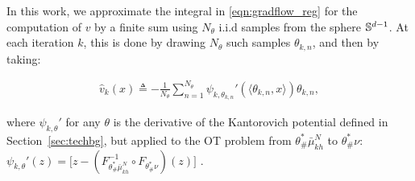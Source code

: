 In this work, we approximate the integral in \eqref{eqn:gradflow_reg} for the computation of $v$ by a finite sum using $N_\theta$ i.i.d samples from the sphere $\mathbb{S}^{d-1}$. At each iteration $k$, this is done by drawing $N_\theta$ such samples $\theta_{k,n}$, and then by taking:

\begin{align}
\hat{v}_k(x) \triangleq - \frac1{N_\theta} \sum\limits_{n=1}^{N_\theta} \psi_{k, \theta_{k,n}}'(\langle\theta_{k,n},x\rangle ) \theta_{k,n}, \label{eqn:approxdrift}
\end{align}

where $\psi_{k, \theta}'$  for any $\theta$ is the derivative of the Kantorovich potential defined in Section~\ref{sec:techbg}, but applied to the OT problem from $\theta^*_\#\bar{\mu}_{kh}^{N}$ to $\theta^*_\#\nu$:
   $\psi_{k, \theta}'(z) = \bigl[ z - (F^{-1}_{\theta^*_\#\bar{\mu}_{kh}^{N}} \circ F_{\theta^*_\#\nu}) (z)  \bigr]$ .%

